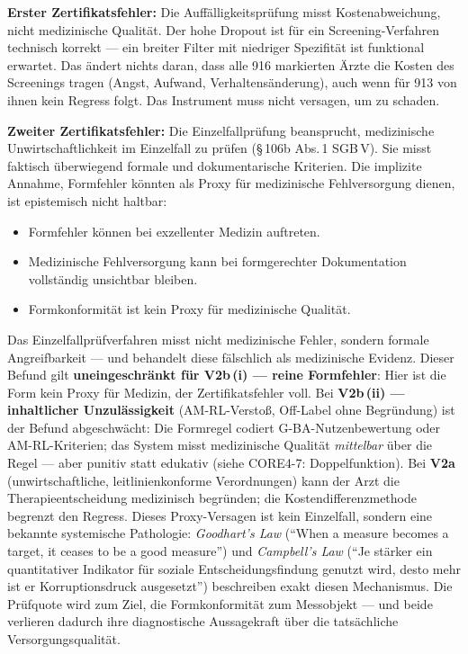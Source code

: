 \documentclass{umbruch-position}
\begin{document}
\medskip
\textbf{Erster Zertifikatsfehler:} Die Auffälligkeitsprüfung misst Kostenabweichung, nicht medizinische Qualität. Der hohe Dropout ist für ein Screening-Verfahren technisch korrekt --- ein breiter Filter mit niedriger Spezifität ist funktional erwartet. Das ändert nichts daran, dass alle 916 markierten Ärzte die Kosten des Screenings tragen (Angst, Aufwand, Verhaltensänderung), auch wenn für 913 von ihnen kein Regress folgt. Das Instrument muss nicht versagen, um zu schaden.

\textbf{Zweiter Zertifikatsfehler:} Die Einzelfallprüfung beansprucht, medizinische Unwirtschaftlichkeit im Einzelfall zu prüfen (\S\,106b Abs.\,1 SGB\,V). Sie misst faktisch überwiegend formale und dokumentarische Kriterien. Die implizite Annahme, Formfehler könnten als Proxy für medizinische Fehlversorgung dienen, ist epistemisch nicht haltbar:

\begin{itemize}[nosep]
  \item Formfehler können bei exzellenter Medizin auftreten.
  \item Medizinische Fehlversorgung kann bei formgerechter Dokumentation vollständig unsichtbar bleiben.
  \item Formkonformität ist kein Proxy für medizinische Qualität.
\end{itemize}

Das Einzelfallprüfverfahren misst nicht medizinische Fehler, sondern formale Angreifbarkeit --- und behandelt diese fälschlich als medizinische Evidenz. Dieser Befund gilt \textbf{uneingeschränkt für V2b\,(i) --- reine Formfehler}: Hier ist die Form kein Proxy für Medizin, der Zertifikatsfehler voll. Bei \textbf{V2b\,(ii) --- inhaltlicher Unzulässigkeit} (AM-RL-Verstoß, Off-Label ohne Begründung) ist der Befund abgeschwächt: Die Formregel codiert G-BA-Nutzenbewertung oder AM-RL-Kriterien; das System misst medizinische Qualität \emph{mittelbar} über die Regel --- aber punitiv statt edukativ (siehe CORE4-7: Doppelfunktion). Bei \textbf{V2a} (unwirtschaftliche, leitlinienkonforme Verordnungen) kann der Arzt die Therapieentscheidung medizinisch begründen; die Kostendifferenzmethode begrenzt den Regress. Dieses Proxy-Versagen ist kein Einzelfall, sondern eine bekannte systemische Pathologie: \textit{Goodhart's Law} (``When a measure becomes a target, it ceases to be a good measure'') und \textit{Campbell's Law} (``Je stärker ein quantitativer Indikator für soziale Entscheidungsfindung genutzt wird, desto mehr ist er Korruptionsdruck ausgesetzt'') beschreiben exakt diesen Mechanismus. Die Prüfquote wird zum Ziel, die Formkonformität zum Messobjekt --- und beide verlieren dadurch ihre diagnostische Aussagekraft über die tatsächliche Versorgungsqualität.
\end{document}
